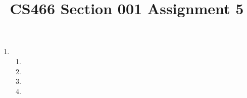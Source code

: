 \documentclass[12pt]{article}
\title{CS466 Section 001 Assignment 5}
\begin{document}
\maketitle

\begin{enumerate}
\item
\begin{enumerate}
\item
\item
\item
\item
\end{enumerate}
\end{enumerate}
\end{document}
